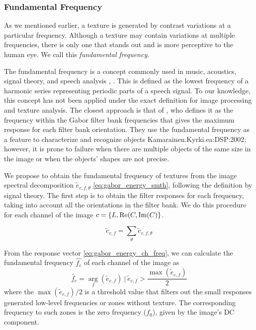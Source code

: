 \subsubsection{Fundamental Frequency}
As we mentioned earlier, a texture is generated by contrast variations at a particular frequency. Although a texture may contain variations at multiple frequencies, there is only one that stands out and is more perceptive to the human eye. We call this \textit{fundamental frequency}.

The fundamental frequency is a concept commonly used in music, acoustics, signal theory, and speech analysis \citep{Benward:BOOK:2014}, \citep{Sigmund:ITC:2013}. This is defined as the lowest frequency of a harmonic series representing periodic parts of a speech signal. To our knowledge, this concept has not been applied under the exact definition for image processing and texture analysis. The closest approach is that of \cite{Kamarainen.Kyrki.ea:ICPR:2002}, who defines it as the frequency within the Gabor filter bank frequencies that gives the maximum response for each filter bank orientation. They use the fundamental frequency as a feature to characterize and recognize objects {Kamarainen.Kyrki.ea:DSP:2002}; however, it is prone to failure when there are multiple objects of the same size in the image or when the objects' shapes are not precise.

We propose to obtain the fundamental frequency of textures from the image spectral decomposition $\widetilde{e}_{c, f, \theta}$ \eqref{eq:gabor_energy_smth}, following the definition by signal theory. The first step is to obtain the filter responses for each frequency, taking into account all the orientations in the filter bank. We do this procedure for each channel of the image $c=\{L, \mathrm{Re}(C, \mathrm{Im}(C)\}$.

\begin{equation}
	\widetilde{e}_{c, f} =  \underset{\theta }{\sum} \widetilde{e}_{c, f, \theta}  \label{eq:gabor_energy_ch_freq}
\end{equation}

From the response vector \eqref{eq:gabor_energy_ch_freq}, we can calculate the fundamental frequency $\widehat{f_c}$ of each channel of the image as
\begin{equation}
	\widetilde{f_c} =  \underset{f}{\arg} (\widetilde{e}_{c, f}) ~|~ \widetilde{e}_{c, f} > \frac{\max(\widetilde{e}_{c, f})}{2} \label{eq:gabor_energy_ch_freq}
\end{equation}
where the $\max(\widetilde{e}_{c, f})/2$ is a threshold value that filters out the small responses generated low-level frequencies or zones without texture. The corresponding frequency to such zones is the zero frequency ($f_0$), given by the image's DC component.

